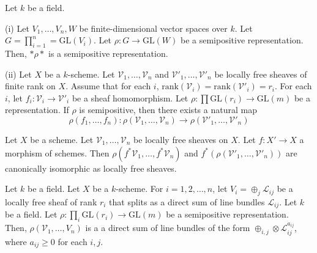 \begin{lemma}
Let $k$ be a field.
\item[(i)]
Let $V_1,\ldots,V_n,W$ be finite-dimensional vector spaces over $k$.
Let $G=\prod_{i=1}^{n}=\mathrm{GL}(V_i)$.
Let $\rho:G\rightarrow \mathrm{GL}(W)$ be a semipositive representation. Then, $*\rho*$ is a semipositive representation.
\item[(ii)] Let $X$ be a $k$-scheme.
Let $\mathcal{V}_1,\dots, \mathcal{V}_n$ and $\mathcal{V}'_1,\dots,\mathcal{V}'_n$ be locally free sheaves of finite rank on $X$.
Assume that for each $i$, $\mathrm{rank}(\mathcal{V}_i)=\mathrm{rank}(\mathcal{V}'_i)=r_i$.
For each $i$, let $f_i:\mathcal{V}_i\rightarrow \mathcal{V}'_i$ be a sheaf homomorphism.
Let $\rho:\prod\mathrm{GL}(r_i)\to\mathrm{GL}(m)$ be a representation.
If $\rho$ is semipositive, then there exists a natural map
$$
\rho(f_1,\dots, f_n):\rho(\mathcal{V}_1,\ldots,\mathcal{V}_n)\rightarrow \rho(\mathcal{V}'_1,\dots,\mathcal{V}'_n)
$$
\end{lemma}



\begin{lemma}\label{pullback_and_rho_commute}
Let $X$ be a scheme.
Let $\mathcal{V}_1,\ldots,\mathcal{V}_n$ be locally free sheaves on $X$. Let $f:X'\rightarrow X$ a morphism of schemes.
Then $\rho(f^*\mathcal{V}_1,\dots,f^*\mathcal{V}_n)$ and $f^*(\rho(\mathcal{V}'_1,\dots,\mathcal{V}'_n))$ are canonically isomorphic as locally free sheaves.
\end{lemma}


\begin{lemma}
Let $k$ be a field.
Let $X$ be a $k$-scheme.
For $i=1,2,\ldots,n$, let $V_i=\oplus_{j}\mathcal{L}_{ij}$ be a locally free sheaf of rank $r_i$ that splits as a direct sum of line bundles $\mathcal{L}_{ij}$.
Let $k$ be a field.
Let $\rho:\prod_{i}\mathrm{GL}(r_i)\to \mathrm{GL}(m)$ be a semipositive representation. 
Then, $\rho(\mathcal{V}_1,\ldots,V_n)$ is a a direct sum of line bundles of the form $\oplus_{i,j}\otimes\mathcal{L}_{ij}^{a_{ij}}$, where $a_{ij}\ge0$ for each $i,j$.
\end{lemma}

